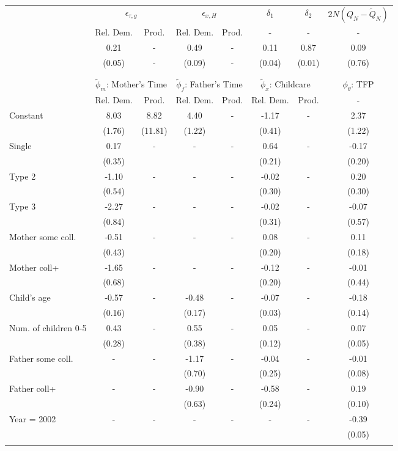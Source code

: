 \begin{tabular}{lccccccc}\toprule
 & \multicolumn{2}{c}{$\epsilon_{\tau,g}$} & \multicolumn{2}{c}{$\epsilon_{x,H}$} & {$\delta_{1}$} & {$\delta_{2}$} & $2N(Q_{N} - \tilde{Q}_{N})$ \\
 & Rel. Dem. & Prod. & Rel. Dem. & Prod. & - & - & - \\\cmidrule(r){2-3}\cmidrule(r){4-5}\cmidrule(r){6-6}\cmidrule(r){7-7}\cmidrule(r){8-8}
&0.21& - &0.49& - &0.11&0.87&0.09\\
&(0.05)& - &(0.09)& - &(0.04)&(0.01)&(0.76)\\
\\
&&&&&&&\\
 & \multicolumn{2}{c}{$\tilde{\phi}_{m}$: Mother's Time} & \multicolumn{2}{c}{$\tilde{\phi}_{f}$: Father's Time} & \multicolumn{2}{c}{$\tilde{\phi}_{x}$: Childcare} &{$\phi_{\theta}$: TFP} \\
 & Rel. Dem. & Prod. & Rel. Dem. & Prod. & Rel. Dem. & Prod. & -  \\\cmidrule(r){2-3}\cmidrule(r){4-5}\cmidrule(r){6-7}\cmidrule(r){8-8}
Constant&8.03&8.82&4.40& -&-1.17& -&2.37\\
&(1.76)&(11.81)&(1.22)&&(0.41)&&(1.22)\\
Single&0.17& -& - & -&0.64& -&-0.17\\
&(0.35)& & &&(0.21)&&(0.20)\\
Type 2&-1.10& -& - & -&-0.02& -&0.20\\
&(0.54)& & &&(0.30)&&(0.30)\\
Type 3&-2.27& -& - & -&-0.02& -&-0.07\\
&(0.84)& & &&(0.31)&&(0.57)\\
Mother some coll.&-0.51& -& - & -&0.08& -&0.11\\
&(0.43)& & &&(0.20)&&(0.18)\\
Mother coll+&-1.65& -& - & -&-0.12& -&-0.01\\
&(0.68)& & &&(0.20)&&(0.44)\\
Child's age&-0.57& -&-0.48& -&-0.07& -&-0.18\\
&(0.16)&&(0.17)&&(0.03)&&(0.14)\\
Num. of children 0-5&0.43& -&0.55& -&0.05& -&0.07\\
&(0.28)&&(0.38)&&(0.12)&&(0.05)\\
Father some coll.& - & -&-1.17& -&-0.04& -&-0.01\\
 & &&(0.70)&&(0.25)&&(0.08)\\
Father coll+& - & -&-0.90& -&-0.58& -&0.19\\
 & &&(0.63)&&(0.24)&&(0.10)\\
Year = 2002& - & -& - & -& - & -&-0.39\\
 & & & & & &&(0.05)\\
\\
\bottomrule\end{tabular}